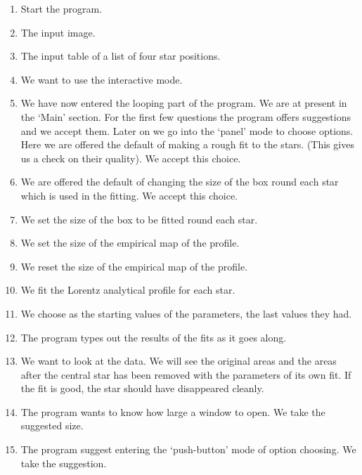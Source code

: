 \begin{small}
{{\begin{enumerate}
\item Start the program.
\item The input image.
\item The input table of a list of four star positions.
\item We want to use the interactive mode.
\item We have now entered the looping part of the program. We are at
      present in the `Main' section. For the first few questions the
      program offers suggestions and we accept them. Later on we go into
      the `panel' mode to choose options. Here we are offered the default
      of making a rough fit to the stars. (This gives us a check on
      their quality). We accept this choice.
\item We are offered the default of changing the size of the box
      round each star which is used in the fitting. We accept this choice.
\item We set the size of the box to be fitted round each star.
\item We set the size of the empirical map of the profile.
\item We reset the size of the empirical map of the profile.
\item We fit the Lorentz analytical profile for each star.
\item We choose as the starting values of the parameters, the last
      values they had.
\item The program types out the results of the fits as it goes
      along.
\item We want to look at the data. We will see the original areas
      and the areas after the central star has been removed with the
      parameters of its own fit. If the fit is good, the star should
      have disappeared cleanly.
\item The program wants to know how large a window to open. We take the
      suggested size.
\item The program suggest entering the `push-button' mode of option
      choosing. We take the suggestion.
\end{enumerate}

\vspace*{\fill}

}}
\end{small}
